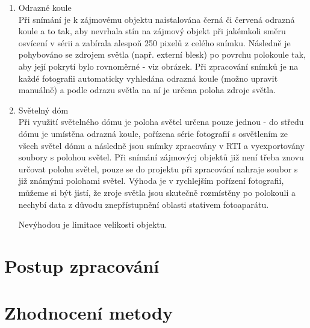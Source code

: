 \begin{enumerate}
	\item {Odrazné koule}\\
	Při snímání je k zájmovému objektu naistalována černá či červená odrazná koule a to tak, aby nevrhala stín na zájmový objekt při jakémkoli směru osvícení v sérii a zabírala alespoň 250 pixelů z celého snímku. Následně je pohybováno se zdrojem světla (např. externí blesk) po povrchu polokoule tak, aby její pokrytí bylo rovnoměrné - viz obrázek.
	Při zpracování snímků je na každé fotografii automaticky vyhledána odrazná koule (možno upravit manuálně) a podle odrazu světla na ní je určena poloha zdroje světla.
	
	\item {Světelný dóm}\\
	Při využití světelného dómu je poloha světel určena pouze jednou - do středu dómu je umístěna odrazná koule, pořízena série fotografií s osvětlením ze všech světel dómu a následně jsou snímky zpracovány v RTI a vyexportovány soubory s polohou světel. 
	Při snímání zájmovýcj objektů již není třeba znovu určovat polohu světel, pouze se do projektu při zpracování nahraje soubor s již známými polohami světel. Výhoda je v rychlejším pořízení fotografií, můžeme si být jistí, že zroje světla jsou skutečně rozmístěny po polokouli a nechybí data z důvodu znepřístupnění oblasti stativem fotoaparátu.
	
	
	 Nevýhodou je limitace velikosti objektu.
	
\end{enumerate}


\section{Postup zpracování}

\section{Zhodnocení metody}

